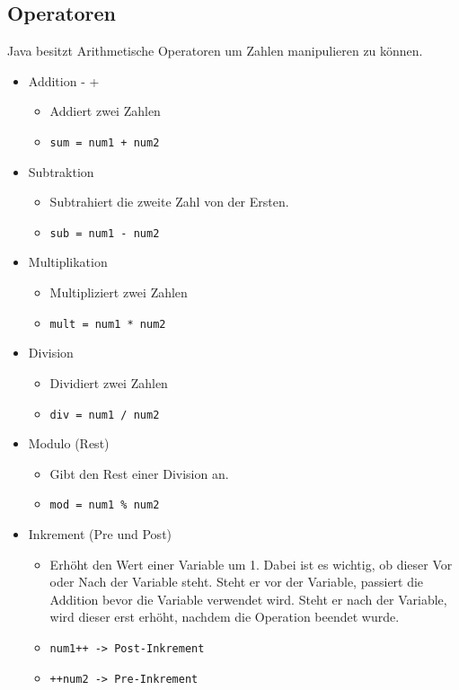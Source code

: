 \documentclass{article}
\begin{document}
	\subsection{Operatoren}
	\label{sec:Operatoren}
	Java besitzt Arithmetische Operatoren um Zahlen manipulieren zu können. \\
	\begin{itemize}
		\item{Addition - +}
		\begin{itemize}
			\item{Addiert zwei Zahlen}
			\item{\verb|sum = num1 + num2|}
		\end{itemize}
		\item{Subtraktion}
		\begin{itemize}
			\item{Subtrahiert die zweite Zahl von der Ersten.}
			\item{\verb|sub = num1 - num2|}
		\end{itemize}
		\item{Multiplikation}
		\begin{itemize}
			\item{Multipliziert zwei Zahlen}
			\item{\verb|mult = num1 * num2|}
		\end{itemize}
		\item{Division}
		\begin{itemize}
			\item{Dividiert zwei Zahlen}
			\item{\verb|div = num1 / num2|}
		\end{itemize}
		\item{Modulo (Rest)}
		\begin{itemize}
			\item{Gibt den Rest einer Division an.}
			\item{\verb|mod = num1 % num2|}
		\end{itemize}
		\item{Inkrement (Pre und Post)}
		\begin{itemize}
			\item{Erhöht den Wert einer Variable um 1. Dabei ist es wichtig, ob dieser Vor oder Nach der Variable steht. Steht er vor der Variable, passiert die Addition bevor die Variable verwendet wird. Steht er nach der Variable, wird dieser erst erhöht, nachdem die Operation beendet wurde.}
			\item{\verb|num1++ -> Post-Inkrement|}
			\item{\verb|++num2 -> Pre-Inkrement|}

\end{itemize}
\end{itemize}
\end{document}
